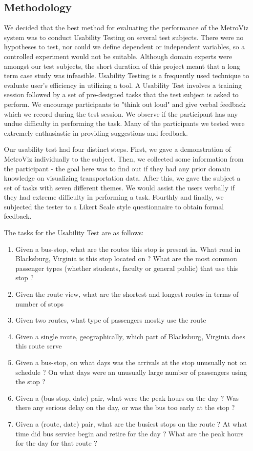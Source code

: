 \documentclass[journal]{vgtc}                %
\begin{document}
\subsection{Methodology}
We decided that the best method for evaluating the performance of the MetroViz system was to conduct Usability Testing on several test subjects. There were no hypotheses to test, nor could we define dependent or independent variables, so a controlled experiment would not be suitable. Although domain experts were amongst our test subjects, the short duration of this project meant that a long term case study was infeasible. Usability Testing is a frequently used technique to evaluate user's efficiency in utilizing a tool. A Usability Test involves a training session followed by a set of pre-designed tasks that the test subject is asked to perform. We encourage participants to "think out loud" and give verbal feedback which we record during the test session. We observe if the participant has any undue difficulty in performing the task. Many of the participants we tested were extremely enthusiastic in providing suggestions and feedback. 

Our usability test had four distinct steps. First, we gave a demonstration of MetroViz individually to the subject. Then, we collected some information from the participant - the goal here was to find out if they had any prior domain knowledge on visualizing transportation data. After this, we gave the subject a set of tasks with seven different themes. We would assist the users verbally if they had extreme difficulty in performing a task. Fourthly and finally, we subjected the tester to a Likert Scale style questionnaire to obtain formal feedback. 

The tasks for the Usability Test are as follows: 
\begin{enumerate}
  \item Given a bus-stop, what are the routes this stop is present in. What road in Blacksburg, Virginia is this stop located on ? What are the most common passenger types (whether students, faculty or general public) that use this stop ?
  \item Given the route view, what are the shortest and longest routes in terms of number of stops
  \item Given two routes, what type of passengers mostly use the route
  \item Given a single route, geographically, which part of Blacksburg, Virginia does this route serve
  \item Given a bus-stop, on what days was the arrivals at the stop unusually not on schedule ? On what days were an unusually large number of passengers using the stop ?
  \item Given a (bus-stop, date) pair, what were the peak hours on the day ? Was there any serious delay on the day, or was the bus too early at the stop ?
  \item Given a (route, date) pair, what are the busiest stops on the route ? At what time did bus service begin and retire for the day ? What are the peak hours for the day for that route ?
\end{enumerate}
\end{document}
